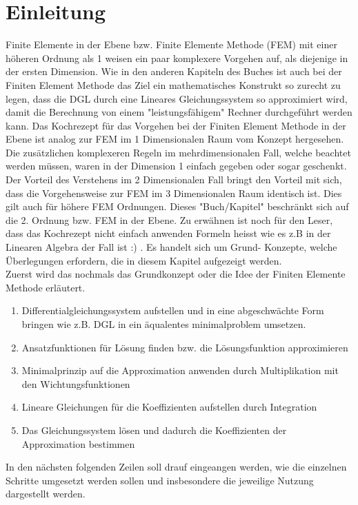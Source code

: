 %
%
%
\section{Einleitung\label{fem:section:einleitung}}
Finite Elemente in der Ebene bzw. Finite Elemente Methode (FEM) mit einer höheren Ordnung als 1 weisen ein paar komplexere Vorgehen auf, als diejenige in der ersten Dimension. Wie in den anderen Kapiteln des Buches ist auch bei der Finiten Element Methode das Ziel ein mathematisches Konstrukt so zurecht zu legen, dass die DGL durch eine Lineares Gleichungssystem so approximiert wird, damit die Berechnung von einem "leistungsfähigem" Rechner durchgeführt werden kann. Das Kochrezept für das Vorgehen bei der Finiten Element Methode in der Ebene ist analog zur FEM im 1 Dimensionalen Raum vom Konzept hergesehen. Die zusätzlichen komplexeren Regeln im mehrdimensionalen Fall, welche beachtet werden müssen, waren in der Dimension 1 einfach gegeben oder sogar geschenkt. Der Vorteil des Verstehens im 2 Dimensionalen Fall bringt den Vorteil mit sich, dass die Vorgehensweise zur FEM im 3 Dimensionalen Raum identisch ist. Dies gilt auch für höhere FEM Ordnungen. Dieses  "Buch/Kapitel" beschränkt sich auf die 2. Ordnung bzw. FEM in der Ebene. Zu erwähnen ist noch für den Leser, dass das Kochrezept nicht einfach anwenden Formeln heisst wie es z.B in der Linearen Algebra der Fall ist :) . Es handelt sich um Grund- Konzepte, welche Überlegungen erfordern, die in diesem Kapitel aufgezeigt werden.\\

Zuerst wird das nochmals das Grundkonzept oder die Idee der Finiten Elemente Methode erläutert.

\begin{enumerate}
	\item Differentialgleichungssystem aufstellen und in eine abgeschwächte Form bringen wie z.B. DGL in ein äqualentes minimalproblem umsetzen.
	\item Ansatzfunktionen für Lösung finden bzw. die Lösungsfunktion approximieren
	\item Minimalprinzip auf die Approximation anwenden durch Multiplikation mit den Wichtungsfunktionen
	\item Lineare Gleichungen für die Koeffizienten aufstellen durch Integration 
	\item Das Gleichungssystem lösen und dadurch die Koeffizienten der Approximation bestimmen
\end{enumerate}

In den nächsten folgenden Zeilen soll drauf eingeangen werden, wie die einzelnen Schritte umgesetzt werden sollen und insbesondere die jeweilige Nutzung dargestellt werden.

